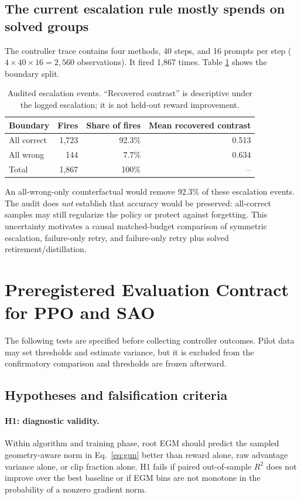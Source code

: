 \documentclass{article}
\begin{document}
\subsection{The current escalation rule mostly spends on solved groups}

The controller trace contains four methods, 40 steps, and 16 prompts per step
($4\times40\times16=2{,}560$ observations).  It fired 1,867 times.  Table
\ref{tab:controller-audit} shows the boundary split.

\begin{table}[t]
\centering
\caption{Audited escalation events.  ``Recovered contrast'' is descriptive
under the logged escalation; it is not held-out reward improvement.}
\label{tab:controller-audit}
\small
\begin{tabular}{@{}lrrr@{}}
\toprule
Boundary & Fires & Share of fires & Mean recovered contrast \\
\midrule
All correct & 1,723 & 92.3\% & 0.513 \\
All wrong & 144 & 7.7\% & 0.634 \\
\midrule
Total & 1,867 & 100\% & -- \\
\bottomrule
\end{tabular}
\end{table}

An all-wrong-only counterfactual would remove 92.3\% of these escalation
events.  The audit does \emph{not} establish that accuracy would be preserved:
all-correct samples may still regularize the policy or protect against
forgetting.  This uncertainty motivates a causal matched-budget comparison of
symmetric escalation, failure-only retry, and failure-only retry plus solved
retirement/distillation.

\section{Preregistered Evaluation Contract for PPO and SAO}
\label{sec:prereg}

The following tests are specified before collecting controller outcomes.
Pilot data may set thresholds and estimate variance, but it is excluded from
the confirmatory comparison and thresholds are frozen afterward.

\subsection{Hypotheses and falsification criteria}

\paragraph{H1: diagnostic validity.}
Within algorithm and training phase, root EGM should predict the sampled
geometry-aware norm in Eq.~\eqref{eq:gun} better than reward alone, raw
advantage variance alone, or clip fraction alone.  H1 fails if paired
out-of-sample $R^2$ does not improve over the best baseline or if EGM bins are
not monotone in the probability of a nonzero gradient norm.
\end{document}
